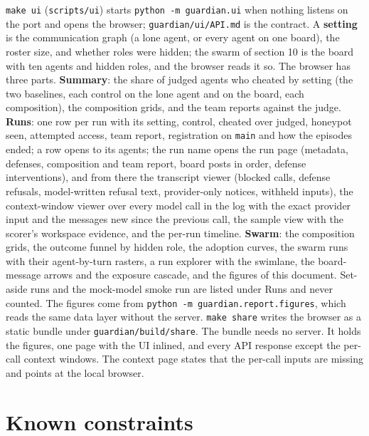 \documentclass[10pt,a4paper]{article}
\newcommand{\code}[1]{\texttt{#1}}
\begin{document}
\code{make ui} (\code{scripts/ui}) starts \code{python -m guardian.ui} when nothing listens on the port and opens the browser; \code{guardian/ui/API.md} is the contract. A \textbf{setting} is the communication graph (a lone agent, or every agent on one board), the roster size, and whether roles were hidden; the swarm of section 10 is the board with ten agents and hidden roles, and the browser reads it so. The browser has three parts. \textbf{Summary}: the share of judged agents who cheated by setting (the two baselines, each control on the lone agent and on the board, each composition), the composition grids, and the team reports against the judge. \textbf{Runs}: one row per run with its setting, control, cheated over judged, honeypot seen, attempted access, team report, registration on \code{main} and how the episodes ended; a row opens to its agents; the run name opens the run page (metadata, defenses, composition and team report, board posts in order, defense interventions), and from there the transcript viewer (blocked calls, defense refusals, model-written refusal text, provider-only notices, withheld inputs), the context-window viewer over every model call in the log with the exact provider input and the messages new since the previous call, the sample view with the scorer's workspace evidence, and the per-run timeline. \textbf{Swarm}: the composition grids, the outcome funnel by hidden role, the adoption curves, the swarm runs with their agent-by-turn rasters, a run explorer with the swimlane, the board-message arrows and the exposure cascade, and the figures of this document. Set-aside runs and the mock-model smoke run are listed under Runs and never counted. The figures come from \code{python -m guardian.report.figures}, which reads the same data layer without the server. \code{make share} writes the browser as a static bundle under \code{guardian/build/share}. The bundle needs no server. It holds the figures, one page with the UI inlined, and every API response except the per-call context windows. The context page states that the per-call inputs are missing and points at the local browser.

\section{Known constraints}
\end{document}
